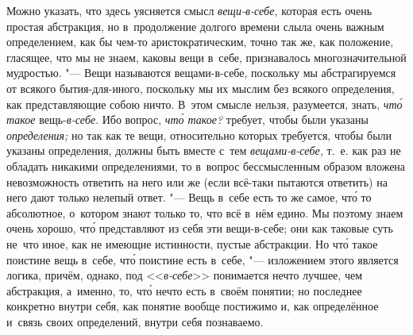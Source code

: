 Можно указать, что здесь уясняется смысл
{\em вещи-в-себе,} которая есть очень простая
абстракция, но в~продолжение долгого времени слыла очень важным
определением, как бы чем-то аристократическим, точно так же, как положение,
гласящее, что мы не знаем, каковы вещи в~себе, признавалось
многозначительной мудростью. "--- Вещи называются вещами-в-себе, поскольку мы
абстрагируемся от всякого бытия-для-иного, поскольку мы их мыслим без
всякого определения, как представляющие собою ничто. В~этом смысле нельзя,
разумеется, знать, {\em чт\'{о} такое}
вещь-{\em в-себе}. Ибо вопрос,
{\em чт\'{о} такое?} требует, чтобы были указаны
{\em определения;} но так как те вещи, относительно
которых требуется, чтобы были указаны определения, должны быть вместе с~тем
{\em вещами-в-себе,} т.~е. как раз не обладать никакими
определениями, то в~вопрос бессмысленным образом вложена невозможность
ответить на него или же (если всё-таки пытаются ответить) на него дают только
нелепый ответ. "--- Вещь в~себе есть то же самое, чт\'{о} то абсолютное,
о~котором знают только то, что всё в~нём едино. Мы поэтому знаем очень
хорошо, чт\'{о} представляют из себя эти вещи-в-себе; они как таковые суть
не~что иное, как не имеющие истинности, пустые абстракции. Но чт\'{о} такое
поистине вещь в~себе, чт\'{о} поистине есть в~себе, "--- изложением этого
является логика, причём, однако, под <<{\em в-себе}>> понимается нечто
лучшее, чем абстракция, а~именно, то, чт\'{о} нечто есть в~своём понятии;
но последнее конкретно внутри себя, как понятие вообще постижимо и, как
определённое и~связь своих определений, внутри себя познаваемо.

